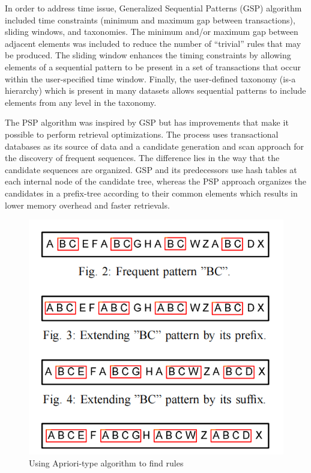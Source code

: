 \documentclass[sigplan, screen]{acmart}
\begin{document}
In order to address time issue, Generalized Sequential Patterns (GSP) algorithm\cite{srikant1996mining} included time constraints 
(minimum and maximum gap between transactions), sliding windows, and taxonomies. The minimum and/or maximum gap between
adjacent elements was included to reduce the number of “trivial” rules that may be produced. The sliding window enhances the
timing constraints by allowing elements of a sequential pattern to be present in a set of
transactions that occur within the user-specified time window. Finally, the user-defined
taxonomy (is-a hierarchy) which is present in many datasets allows sequential patterns
to include elements from any level in the taxonomy.

The PSP algorithm\cite{masseglia1998psp} was inspired by GSP but has improvements that make it possible to perform retrieval optimizations. 
The process uses transactional databases as its source of data and a candidate generation and scan approach
for the discovery of frequent sequences. The difference lies in the way that the candidate
sequences are organized. GSP and its predecessors use hash tables at each internal
node of the candidate tree, whereas the PSP approach organizes the candidates in a
prefix-tree according to their common elements which results in lower memory overhead and faster retrievals.
\begin{figure}[h]
  \centering
  \includegraphics[width=\linewidth]{figures/CASAS}
  \caption{Using Apriori-type algorithm to find rules\cite{rashidi2009keeping}}
\end{figure}
\end{document}
